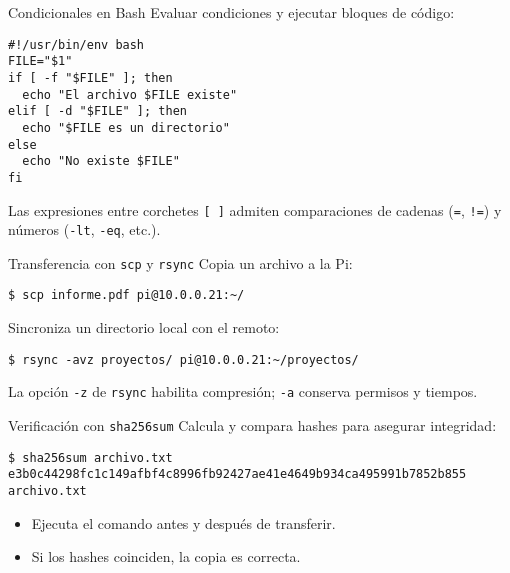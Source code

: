 \documentclass[aspectratio=169,professionalfonts]{beamer}
\begin{document}
\begin{frame}[fragile]{Condicionales en Bash}
  Evaluar condiciones y ejecutar bloques de código:
  \begin{verbatim}
#!/usr/bin/env bash
FILE="$1"
if [ -f "$FILE" ]; then
  echo "El archivo $FILE existe"
elif [ -d "$FILE" ]; then
  echo "$FILE es un directorio"
else
  echo "No existe $FILE"
fi
  \end{verbatim}
  \begin{infobox}
  Las expresiones entre corchetes \texttt{[ ]} admiten comparaciones de cadenas (\texttt{=}, \texttt{!=}) y números (\texttt{-lt}, \texttt{-eq}, etc.).
  \end{infobox}
\end{frame}

\begin{frame}[fragile]{Transferencia con \texttt{scp} y \texttt{rsync}}
  Copia un archivo a la Pi:
  \begin{verbatim}
$ scp informe.pdf pi@10.0.0.21:~/
  \end{verbatim}
  Sincroniza un directorio local con el remoto:
  \begin{verbatim}
$ rsync -avz proyectos/ pi@10.0.0.21:~/proyectos/
  \end{verbatim}
  \begin{infobox}
  La opción \texttt{-z} de \texttt{rsync} habilita compresión; \texttt{-a} conserva permisos y tiempos.
  \end{infobox}
\end{frame}

\begin{frame}[fragile]{Verificación con \texttt{sha256sum}}
  Calcula y compara hashes para asegurar integridad:
  \begin{verbatim}
$ sha256sum archivo.txt
e3b0c44298fc1c149afbf4c8996fb92427ae41e4649b934ca495991b7852b855  archivo.txt
  \end{verbatim}
  \begin{itemize}
    \item Ejecuta el comando antes y después de transferir.
    \item Si los hashes coinciden, la copia es correcta.
  \end{itemize}
\end{frame}
\end{document}
